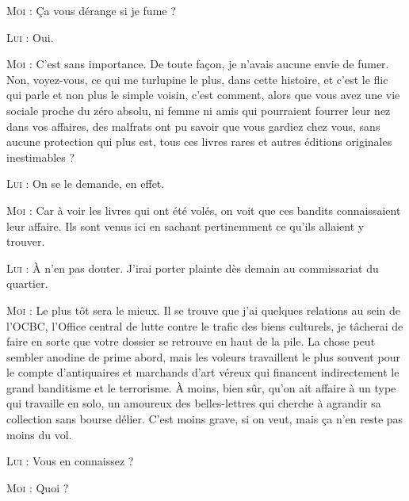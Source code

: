 \begin{dialogue}
\textsc{Moi} : Ça vous dérange si je fume ?

\textsc{Lui} : Oui.

\textsc{Moi} : C’est sans importance. De toute façon, je n’avais aucune envie de fumer. Non, voyez-vous, ce qui me turlupine le plus, dans cette histoire, et c’est le flic qui parle et non plus le simple voisin, c’est comment, alors que vous avez une vie sociale proche du zéro absolu, ni femme ni amis qui pourraient fourrer leur nez dans vos affaires, des malfrats ont pu savoir que vous gardiez chez vous, sans aucune protection qui plus est, tous ces livres rares et autres éditions originales inestimables ?

\textsc{Lui} : On se le demande, en effet.

\textsc{Moi} : Car à voir les livres qui ont été volés, on voit que ces bandits connaissaient leur affaire. Ils sont venus ici en sachant pertinemment ce qu’ils allaient y trouver.

\textsc{Lui} : À n’en pas douter. J’irai porter plainte dès demain au commissariat du quartier.

%
%
%
\textsc{Moi} : Le plus tôt sera le mieux. Il se trouve que j’ai quelques relations au sein de l’OCBC, l’Office central de lutte contre le trafic des biens culturels, je tâcherai de faire en sorte que votre dossier se retrouve en haut de la pile. La chose peut sembler anodine de prime abord, mais les voleurs travaillent le plus souvent pour le compte d’antiquaires et marchands d’art véreux qui financent indirectement le grand banditisme et le terrorisme. À moins, bien sûr, qu’on ait affaire à un type qui travaille en solo, un amoureux des belles-lettres qui cherche à agrandir sa collection sans bourse délier. C’est moins grave, si on veut, mais ça n’en reste pas moins du vol.

\textsc{Lui} : Vous en connaissez ?

\textsc{Moi} : Quoi ?


\end{dialogue}

